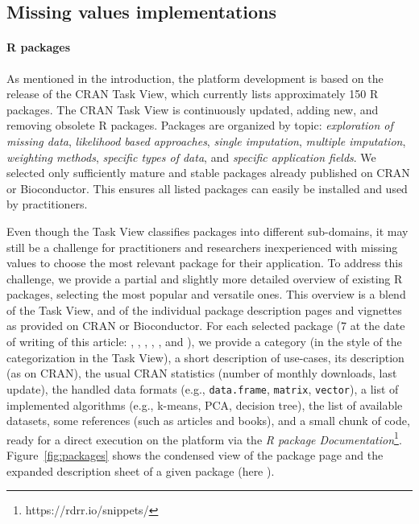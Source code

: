 \subsection{Missing values implementations}

\paragraph*{{R} packages}

As mentioned in the introduction, the platform development is based on the release of the  CRAN Task View, which
currently lists approximately 150 {R} packages. The CRAN Task View is continuously updated, adding new, and removing obsolete {R} packages. Packages are organized by topic: \textit{exploration of missing data},
\textit{likelihood based approaches},
\textit{single imputation}, \textit{multiple imputation}, \textit{weighting methods},
\textit{specific types of data}, and \textit{specific application fields}.
We selected only sufficiently mature and stable packages already published on CRAN or Bioconductor. This ensures  all listed
packages can easily be installed and used by practitioners.

Even though the Task View classifies packages into different sub-domains, it may still be a challenge for practitioners and researchers inexperienced with missing values to choose the most relevant package for their application. To address this challenge, we provide a partial and slightly more detailed 
overview of existing {R} packages, selecting the most popular and versatile ones. This overview is a blend of the
Task View, and of the individual package description pages and vignettes as provided on CRAN or Bioconductor. For each
selected package (7 at the date of writing of this article: , , , , ,  and ), we provide a category (in the style of the categorization in the Task View), a
short description of use-cases, its description (as on CRAN), the usual CRAN
statistics (number of monthly downloads, last update), the
handled data formats (e.g., \texttt{data.frame}, \texttt{matrix},
\texttt{vector}), a list of implemented algorithms (e.g., k-means,
PCA, decision tree), the list of available datasets, some references (such as articles and books), and a small chunk of code, ready for a direct execution on the platform
via the \textit{{R} package Documentation}\footnote{https://rdrr.io/snippets/}.
Figure~\ref{fig:packages} shows the condensed view of the package page and the
expanded description sheet of a given package (here ).

